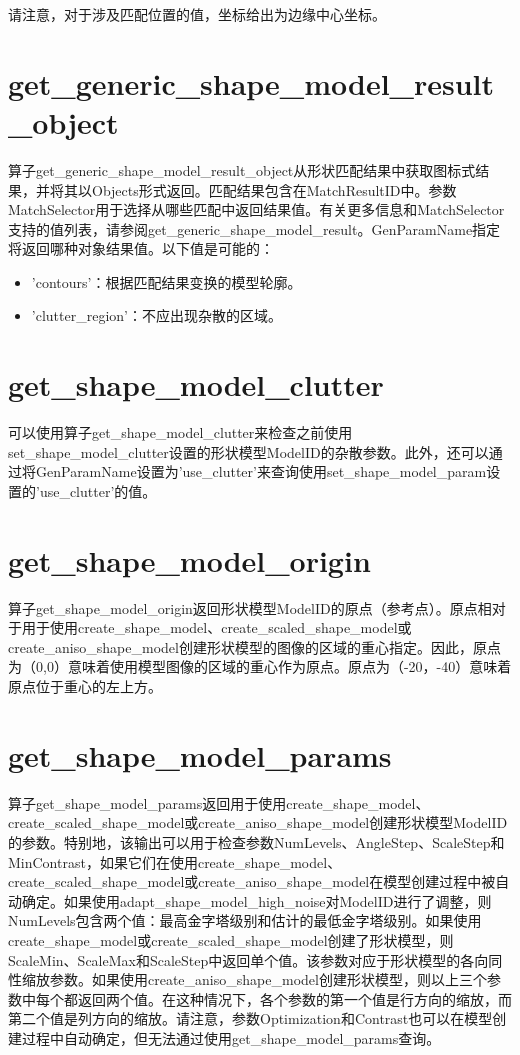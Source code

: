 \documentclass{article}
\begin{document}
请注意，对于涉及匹配位置的值，坐标给出为边缘中心坐标。

\section{get\_generic\_shape\_model\_result\_object}
算子get\_generic\_shape\_model\_result\_object从形状匹配结果中获取图标式结果，并将其以Objects形式返回。匹配结果包含在MatchResultID中。参数MatchSelector用于选择从哪些匹配中返回结果值。有关更多信息和MatchSelector支持的值列表，请参阅get\_generic\_shape\_model\_result。GenParamName指定将返回哪种对象结果值。以下值是可能的：
\begin{itemize}
	\item 'contours'：根据匹配结果变换的模型轮廓。

	\item 'clutter\_region'：不应出现杂散的区域。

\end{itemize}

\section{get\_shape\_model\_clutter}
可以使用算子get\_shape\_model\_clutter来检查之前使用set\_shape\_model\_clutter设置的形状模型ModelID的杂散参数。此外，还可以通过将GenParamName设置为'use\_clutter'来查询使用set\_shape\_model\_param设置的'use\_clutter'的值。

\section{get\_shape\_model\_origin}
算子get\_shape\_model\_origin返回形状模型ModelID的原点（参考点）。原点相对于用于使用create\_shape\_model、create\_scaled\_shape\_model或create\_aniso\_shape\_model创建形状模型的图像的区域的重心指定。因此，原点为（0,0）意味着使用模型图像的区域的重心作为原点。原点为（-20，-40）意味着原点位于重心的左上方。

\section{get\_shape\_model\_params}
算子get\_shape\_model\_params返回用于使用create\_shape\_model、create\_scaled\_shape\_model或create\_aniso\_shape\_model创建形状模型ModelID的参数。特别地，该输出可以用于检查参数NumLevels、AngleStep、ScaleStep和MinContrast，如果它们在使用create\_shape\_model、create\_scaled\_shape\_model或create\_aniso\_shape\_model在模型创建过程中被自动确定。如果使用adapt\_shape\_model\_high\_noise对ModelID进行了调整，则NumLevels包含两个值：最高金字塔级别和估计的最低金字塔级别。如果使用create\_shape\_model或create\_scaled\_shape\_model创建了形状模型，则ScaleMin、ScaleMax和ScaleStep中返回单个值。该参数对应于形状模型的各向同性缩放参数。如果使用create\_aniso\_shape\_model创建形状模型，则以上三个参数中每个都返回两个值。在这种情况下，各个参数的第一个值是行方向的缩放，而第二个值是列方向的缩放。请注意，参数Optimization和Contrast也可以在模型创建过程中自动确定，但无法通过使用get\_shape\_model\_params查询。
\end{document}
